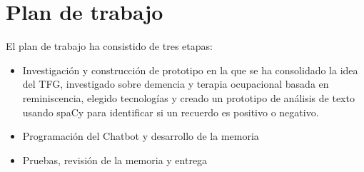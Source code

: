 \section{Plan de trabajo}

El plan de trabajo ha consistido de tres etapas:
\begin{itemize}
	\item Investigación y construcción de prototipo en la que se ha consolidado la idea del TFG, investigado sobre demencia y terapia ocupacional basada en reminiscencia, elegido tecnologías y creado un prototipo de análisis de texto usando spaCy para identificar si un recuerdo es positivo o negativo.
	\item Programación del Chatbot y desarrollo de la memoria
	\item Pruebas, revisión de la memoria y entrega
\end{itemize}
